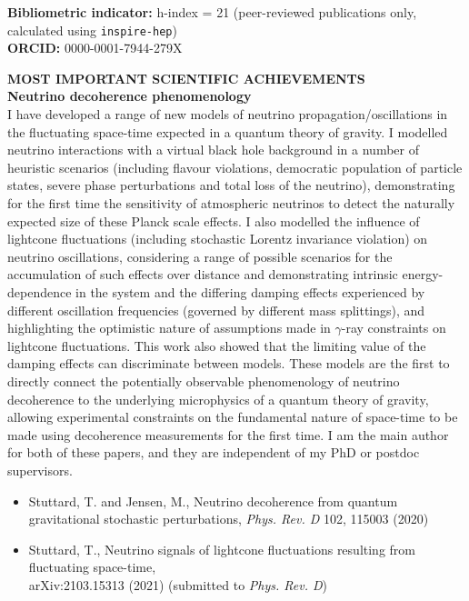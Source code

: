 \documentclass[a4paper,11pt]{article}
\renewcommand{\smallskip} {\vspace{0.1in}}
\begin{document}
\textbf{Bibliometric indicator:} h-index = 21 (peer-reviewed publications only, calculated using \texttt{inspire-hep}) \\
\textbf{ORCID:} 0000-0001-7944-279X

\vspace{0.3cm}

\textbf{MOST IMPORTANT SCIENTIFIC ACHIEVEMENTS ~~\hrulefill}\smallskip\\
%
{\bf Neutrino decoherence phenomenology} \\ 
I have developed a range of new models of neutrino propagation/oscillations in the fluctuating space-time expected in a quantum theory of gravity. I modelled neutrino interactions with a virtual black hole background in a number of heuristic scenarios  (including flavour violations, democratic population of particle states, severe phase perturbations and total loss of the neutrino), demonstrating for the first time the sensitivity of atmospheric neutrinos to detect the naturally expected size of these Planck scale effects. I also modelled the influence of lightcone fluctuations (including stochastic Lorentz invariance violation) on neutrino oscillations, considering a range of possible scenarios for the accumulation of such effects over distance and demonstrating intrinsic energy-dependence in the system and the differing damping effects experienced by different oscillation frequencies (governed by different mass splittings), and highlighting the optimistic nature of assumptions made in $\gamma$-ray constraints on lightcone fluctuations. This work also showed that the limiting value of the damping effects can discriminate between models. These models are the first to directly connect the potentially observable phenomenology of neutrino decoherence to the underlying microphysics of a quantum theory of gravity, allowing experimental constraints on the fundamental nature of space-time to be made using decoherence measurements for the first time. I am the main author for both of these papers, and they are independent of my PhD or postdoc supervisors.

\begin{itemize}
  \item Stuttard, T. and Jensen, M., Neutrino decoherence from quantum gravitational stochastic perturbations, \textit{Phys. Rev. D} 102, 115003 (2020)
  \item Stuttard, T., Neutrino signals of lightcone fluctuations resulting from fluctuating space-time, \\ arXiv:2103.15313 (2021) (submitted to \textit{Phys. Rev. D})
\end{itemize}
\end{document}
